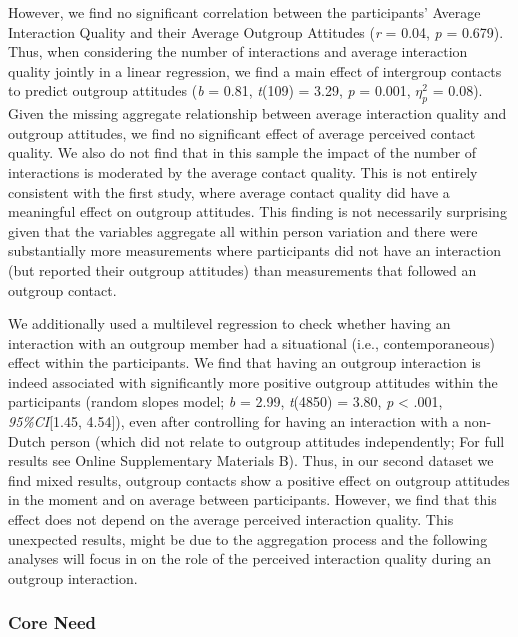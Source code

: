 However, we find no significant correlation between the participants'
Average Interaction Quality and their Average Outgroup Attitudes
(\textit{r} = 0.04, \textit{p} = 0.679). Thus, when considering the
number of interactions and average interaction quality jointly in a
linear regression, we find a main effect of intergroup contacts to
predict outgroup attitudes (\textit{b} = 0.81, \textit{t}(109) = 3.29,
\textit{p} = 0.001, \(\eta_p^2\) = 0.08). Given the missing aggregate
relationship between average interaction quality and outgroup attitudes,
we find no significant effect of average perceived contact quality. We
also do not find that in this sample the impact of the number of
interactions is moderated by the average contact quality. This is not
entirely consistent with the first study, where average contact quality
did have a meaningful effect on outgroup attitudes. This finding is not
necessarily surprising given that the variables aggregate all within
person variation and there were substantially more measurements where
participants did not have an interaction (but reported their outgroup
attitudes) than measurements that followed an outgroup contact.

We additionally used a multilevel regression to check whether having an
interaction with an outgroup member had a situational (i.e.,
contemporaneous) effect within the participants. We find that having an
outgroup interaction is indeed associated with significantly more
positive outgroup attitudes within the participants (random slopes
model; \textit{b} = 2.99, \textit{t}(4850) = 3.80, \textit{p}
\textless{} .001, \textit{95\%CI}{[}1.45, 4.54{]}), even after
controlling for having an interaction with a non-Dutch person (which did
not relate to outgroup attitudes independently; For full results see
Online Supplementary Materials B). Thus, in our second dataset we find
mixed results, outgroup contacts show a positive effect on outgroup
attitudes in the moment and on average between participants. However, we
find that this effect does not depend on the average perceived
interaction quality. This unexpected results, might be due to the
aggregation process and the following analyses will focus in on the role
of the perceived interaction quality during an outgroup interaction.

\subsubsection{Core Need}

